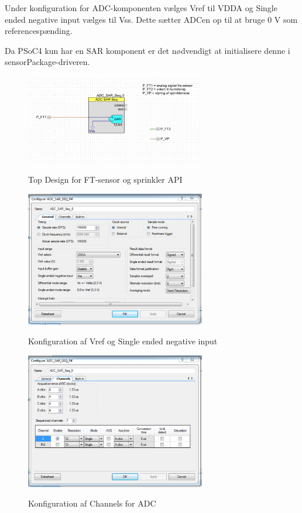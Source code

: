 Under konfiguration for ADC-komponenten vælges Vref til VDDA og Single ended negative input vælges til Vss. Dette sætter ADCen op til at bruge 0 V som referencespænding.

Da PSoC4 kun har en SAR komponent er det nødvendigt at initialisere denne i sensorPackage-driveren.

\begin{figure}[htb]
\centering
{\includegraphics[width=0.70\textwidth]{filer/pics/psoc_api_topdesign}}
\caption{Top Design for FT-sensor og sprinkler API}
\label{lab:psoc_api_topdesign}
\end{figure}

\begin{figure}[htb]
\centering
{\includegraphics[width=0.70\textwidth]{filer/pics/psoc_api_config1}}
\caption{Konfiguration af Vref og Single ended negative input}
\label{lab:psoc_api_config1}
\end{figure}

\begin{figure}[htb]
\centering
{\includegraphics[width=0.70\textwidth]{filer/pics/psoc_api_config2}}
\caption{Konfiguration af Channels for ADC}
\label{lab:psoc_api_config2}
\end{figure}